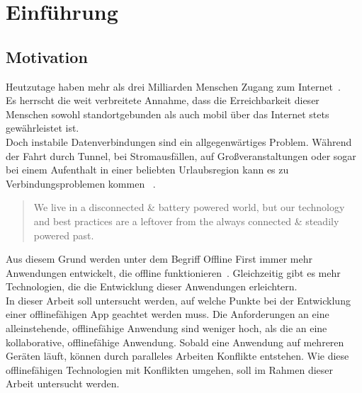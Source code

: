 \chapter{\label{chap:einleitung}Einführung}
\section{Motivation}

Heutzutage haben mehr als drei Milliarden Menschen Zugang zum Internet~\cite{dev-report}.\\
Es herrscht die weit verbreitete Annahme, dass die Erreichbarkeit dieser Menschen sowohl standortgebunden als auch mobil über das Internet stets gewährleistet ist.\\
Doch instabile Datenverbindungen sind ein allgegenwärtiges Problem. Während der Fahrt durch Tunnel, bei Stromausfällen, auf Großveranstaltungen oder sogar bei einem Aufenthalt in einer beliebten Urlaubsregion kann es zu Verbindungsproblemen kommen ~\cite{offline_ux, ndr}.\vspace{0.3cm}
\begin{quote}
	We live in a disconnected \& battery powered world, but our technology and best practices are a leftover from the always connected \& steadily powered past.
	\cite{offlinefirst}\vspace{0.3cm}
\end{quote}
%
Aus diesem Grund werden unter dem Begriff Offline First immer mehr Anwendungen entwickelt, die offline funktionieren~\cite{heise}.
Gleichzeitig gibt es mehr Technologien, die die Entwicklung dieser Anwendungen erleichtern.\\
In dieser Arbeit soll untersucht werden, auf welche Punkte bei der Entwicklung einer offlinefähigen \gls{App} geachtet werden muss.
Die Anforderungen an eine alleinstehende, offlinefähige Anwendung sind weniger hoch, als die an eine kollaborative, offlinefähige Anwendung.
Sobald eine Anwendung auf mehreren Geräten läuft, können durch paralleles Arbeiten Konflikte entstehen.
Wie diese offlinefähigen Technologien mit Konflikten umgehen, soll im Rahmen dieser Arbeit untersucht werden.
%
%
\clearpage
